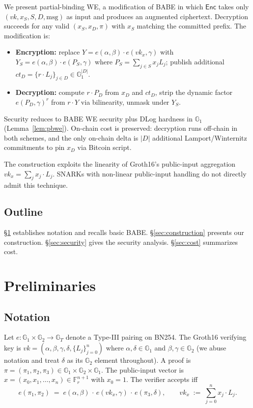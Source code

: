\documentclass[11pt]{article}
\newcommand{\Gone}{\mathbb{G}_1}
\newcommand{\Gtwo}{\mathbb{G}_2}
\newcommand{\Gt}{\mathbb{G}_T}
\newcommand{\Fr}{\mathbb{F}_r}
\newcommand{\msg}{\mathrm{msg}}
\newcommand{\Enc}{\mathsf{Enc}}
\begin{document}
We present partial-binding WE, a modification of BABE in which
$\Enc$ takes only $(vk, x_S, S, D, \msg)$ as input and produces an
augmented ciphertext. Decryption succeeds for any valid
$(x_S, x_D, \pi)$ with $x_S$ matching the committed prefix. The
modification is:

\begin{itemize}
  \item \textbf{Encryption:} replace $Y = e(\alpha, \beta) \cdot e(vk_x, \gamma)$ with
    $Y_S = e(\alpha, \beta) \cdot e(P_S, \gamma)$ where
    $P_S = \sum_{j \in S} x_j L_j$; publish additional
    $ct_D = \{r \cdot L_j\}_{j \in D} \in \Gone^{|D|}$.
  \item \textbf{Decryption:} compute $r \cdot P_D$ from $x_D$ and
    $ct_D$, strip the dynamic factor $e(P_D, \gamma)^r$ from
    $r \cdot Y$ via bilinearity, unmask under $Y_S$.
\end{itemize}

Security reduces to BABE WE security plus DLog hardness in $\Gone$
(Lemma~\ref{lem:pbwe}). On-chain cost is preserved: decryption runs
off-chain in both schemes, and the only on-chain delta is $|D|$
additional Lamport/Winternitz commitments to pin $x_D$ via Bitcoin
script.

The construction exploits the linearity of Groth16's public-input
aggregation $vk_x = \sum_j x_j \cdot L_j$. SNARKs with non-linear
public-input handling do not directly admit this technique.

\subsection{Outline}

\S\ref{sec:prelim} establishes notation and recalls basic BABE.
\S\ref{sec:construction} presents our construction.
\S\ref{sec:security} gives the security analysis.
\S\ref{sec:cost} summarizes cost.

\section{Preliminaries}\label{sec:prelim}

\subsection{Notation}

Let $e : \Gone \times \Gtwo \to \Gt$ denote a Type-III pairing on
BN254. The Groth16 verifying key is
$vk = (\alpha, \beta, \gamma, \delta, \{L_j\}_{j=0}^{n})$ where
$\alpha, \delta \in \Gone$ and $\beta, \gamma \in \Gtwo$ (we abuse
notation and treat $\delta$ as its $\Gtwo$ element throughout). A
proof is $\pi = (\pi_1, \pi_2, \pi_3) \in \Gone \times \Gtwo \times \Gone$.
The public-input vector is $x = (x_0, x_1, \ldots, x_n) \in \Fr^{n+1}$
with $x_0 = 1$. The verifier accepts iff
\begin{equation}
  e(\pi_1, \pi_2) \;=\; e(\alpha, \beta)\,\cdot\,e(vk_x, \gamma)\,\cdot\,e(\pi_3, \delta),
  \qquad vk_x \;:=\; \sum_{j=0}^{n} x_j \cdot L_j.
  \label{eq:g16}
\end{equation}
\end{document}
